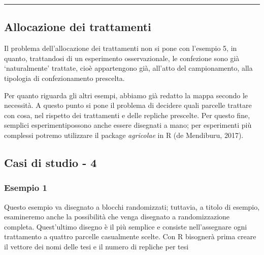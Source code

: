 \documentclass[a4paper,12pt,oneside]{book}
\newenvironment{Shaded}{\begin{snugshade}}{\end{snugshade}}
\newcommand{\KeywordTok}[1]{\textcolor[rgb]{0.13,0.29,0.53}{\textbf{#1}}}
\newcommand{\DataTypeTok}[1]{\textcolor[rgb]{0.13,0.29,0.53}{#1}}
\newcommand{\DecValTok}[1]{\textcolor[rgb]{0.00,0.00,0.81}{#1}}
\newcommand{\StringTok}[1]{\textcolor[rgb]{0.31,0.60,0.02}{#1}}
\newcommand{\OperatorTok}[1]{\textcolor[rgb]{0.81,0.36,0.00}{\textbf{#1}}}
\newcommand{\NormalTok}[1]{#1}
\begin{document}
\begin{center}\rule{0.5\linewidth}{\linethickness}\end{center}

\subsection{Allocazione dei
trattamenti}\label{allocazione-dei-trattamenti}

Il problema dell'allocazione dei trattamenti non si pone con l'esempio
5, in quanto, trattandosi di un esperimento osservazionale, le
confezione sono già `naturalmente' trattate, cioè appartengono già,
all'atto del campionamento, alla tipologia di confezionamento prescelta.

Per quanto riguarda gli altri esempi, abbiamo già redatto la mappa
secondo le necessità. A questo punto si pone il problema di decidere
quali parcelle trattare con cosa, nel rispetto dei trattamenti e delle
repliche prescelte. Per questo fine, semplici esperimentipossono anche
essere disegnati a mano; per esperimenti più complessi potremo
utilizzare il package \emph{agricolae} in R (de Mendiburu, 2017).

\subsection{Casi di studio - 4}\label{casi-di-studio---4}

\subsubsection{Esempio 1}\label{esempio-1-1}

Questo esempio va disegnato a blocchi randomizzati; tuttavia, a titolo
di esempio, esamineremo anche la possibilità che venga disegnato a
randomizzazione completa. Quest'ultimo disegno è il più semplice e
consiste nell'assegnare ogni trattamento a quattro parcelle casualmente
scelte. Con R bisognerà prima creare il vettore dei nomi delle tesi e il
numero di repliche per tesi

\begin{Shaded}
\end{Shaded}
\end{document}
